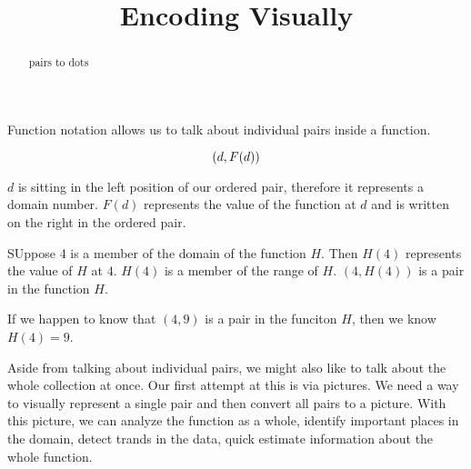 \documentclass{ximera}
\title{Encoding Visually}
\begin{document}
\begin{abstract}
pairs to dots
\end{abstract}
\maketitle


Function notation allows us to talk about individual pairs inside a function.


\[
\large{ (d, F(d))}
\]

$d$ is sitting in the left position of our ordered pair, therefore it represents a domain number. $F(d)$ represents the value of the function at $d$ and is written on the right in the ordered pair.


\begin{example}
SUppose 4 is a member of the domain of the function $H$. Then $H(4)$ represents the value of $H$ at $4$. $H(4)$ is a member of the range of $H$. $(4, H(4))$ is a pair in the function $H$.

If we happen to know that $(4, 9)$ is a pair in the funciton $H$, then we know $H(4) = 9$.

\end{example}


Aside from talking about individual pairs, we might also like to talk about the whole collection at once.  Our first attempt at this is via pictures. We need a way to visually represent a single pair and then convert all pairs to a picture.  With this picture, we can analyze the function as a whole, identify important places in the domain, detect trands in the data, quick estimate information about the whole function.
\end{document}
